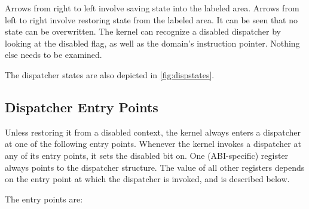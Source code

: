 \documentclass[a4paper,11pt,twoside]{report}
\begin{document}
Arrows from right to left involve saving state into the labeled
area. Arrows from left to right involve restoring state from the
labeled area. It can be seen that no state can be overwritten. The
kernel can recognize a disabled dispatcher by looking at the
disabled flag, as well as the domain's instruction pointer. Nothing
else needs to be examined.

The dispatcher states are also depicted in \autoref{fig:dispstates}.

\subsection{Dispatcher Entry Points}

Unless restoring it from a disabled context, the kernel always
enters a dispatcher at one of the following entry
points. Whenever the kernel invokes a dispatcher at any of its entry
points, it sets the disabled bit on. One (ABI-specific) register
always points to the dispatcher structure. The value of all other
registers depends on the entry point at which the dispatcher is
invoked, and is described below.

The entry points are:
\end{document}
